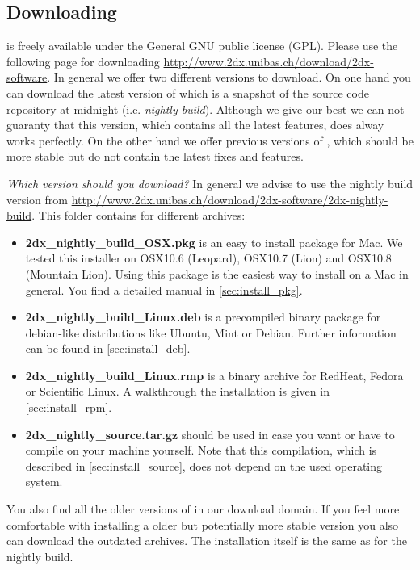 \newpage


\subsection{Downloading {\twodx}}
{\twodx} is freely available under the General GNU public license (GPL). Please use the following page for downloading {\twodx} \url{http://www.2dx.unibas.ch/download/2dx-software}. In general we offer two different versions to download. On one hand you can download the latest version of {\twodx} which is a snapshot of the source code repository at midnight (i.e. \textit{nightly build}). Although we give our best we can not guaranty that this version, which contains all the latest features, does alway works perfectly. On the other hand we offer previous versions of {\twodx}, which should be more stable but do not contain the latest fixes and features. 

\textit{Which version should you download?} In general we advise to use the nightly build version from \url{http://www.2dx.unibas.ch/download/2dx-software/2dx-nightly-build}. This folder contains for different archives:

\begin{itemize}
	\item \textbf{2dx\_nightly\_build\_OSX.pkg} is an easy to install package for Mac. We tested this installer on OSX10.6 (Leopard), OSX10.7 (Lion) and OSX10.8 (Mountain Lion). Using this package is the easiest way to install {\twodx} on a Mac in general. You find a detailed manual in \autoref{sec:install_pkg}.
	\item \textbf{2dx\_nightly\_build\_Linux.deb} is a precompiled binary package for debian-like distributions like Ubuntu, Mint or Debian. Further information can be found in \autoref{sec:install_deb}.
	\item \textbf{2dx\_nightly\_build\_Linux.rmp} is a binary archive for RedHeat, Fedora or Scientific Linux. A walkthrough the installation is given in \autoref{sec:install_rpm}.
	\item \textbf{2dx\_nightly\_source.tar.gz} should be used in case you want or have to compile {\twodx} on your machine yourself. Note that this compilation, which is described in \autoref{sec:install_source}, does not depend on the used operating system.
\end{itemize}

You also find all the older versions of {\twodx} in our download domain. If you feel more comfortable with installing a older but potentially more stable version you also can download the outdated archives. The installation itself is the same as for the nightly build.

